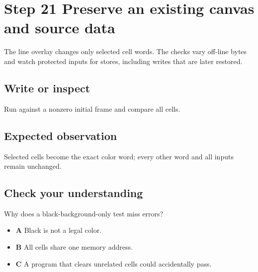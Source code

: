 \section{Step 21 Preserve an existing canvas and source
  data}\label{007-bresenham-line-s21-step-21-preserve-an-existing-canvas-and-source-data}

The line overlay changes only selected cell words. The checks vary
off-line bytes and watch protected inputs for stores, including writes
that are later restored.

\subsection{Write or
  inspect}\label{007-bresenham-line-s21-write-or-inspect}

Run against a nonzero initial frame and compare all cells.

\subsection{Expected
  observation}\label{007-bresenham-line-s21-expected-observation}

Selected cells become the exact color word; every other word and all
inputs remain unchanged.

\subsection{Check your
  understanding}\label{007-bresenham-line-s21-check-your-understanding}

Why does a black-background-only test miss errors?

\begin{itemize}
  \tightlist
  \item
        \textbf{A} Black is not a legal color.
  \item
        \textbf{B} All cells share one memory address.
  \item
        \textbf{C} A program that clears unrelated cells could accidentally
        pass.
\end{itemize}

